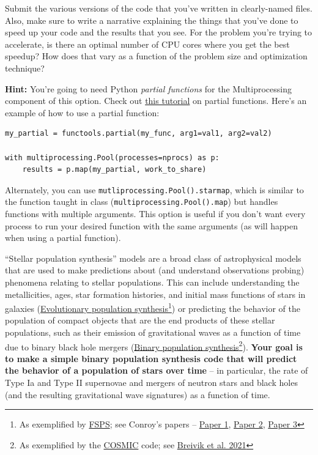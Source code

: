 \documentclass[10pt]{article}
\begin{document}
 Submit the various versions of the code that you've written in
 clearly-named files.  Also, make sure to write a narrative explaining
 the things that you've done to speed up your code and the results
 that you see.  For the problem you're trying to accelerate, is there
 an optimal number of CPU cores where you get the best speedup?  How
 does that vary as a function of the problem size and optimization technique?

\vspace{2mm}
 \noindent
\textbf{Hint:} You're going to need Python \textit{partial functions}
for the Multiprocessing component of this option.  Check out
\href{https://www.pythontutorial.net/python-basics/python-partial-functions/}{this
  tutorial}
on partial functions.  Here's an example of how to use a partial
function:

\begin{verbatim}
my_partial = functools.partial(my_func, arg1=val1, arg2=val2)

with multiprocessing.Pool(processes=nprocs) as p:
    results = p.map(my_partial, work_to_share)
\end{verbatim}

Alternately, you can use \texttt{mutliprocessing.Pool().starmap},
which is similar to the function taught in class
(\texttt{multiprocessing.Pool().map}) but handles functions with
multiple arguments. This option is useful if you don't want every
process to run your desired function with the same arguments (as will
happen when using a partial function). 


 
\newpage
{}  ``Stellar population synthesis''
models are a broad class of astrophysical models that are used to make
predictions about (and understand observations probing) phenomena
relating to stellar populations.  This can include understanding the
metallicities, ages, star formation histories, and initial mass
functions of stars in galaxies
(\href{https://academic.oup.com/mnras/article/362/3/799/976732}{Evolutionary
population synthesis}\footnote{As exemplified by
\href{https://github.com/cconroy20/fsps}{FSPS}; see Conroy's papers --
\href{https://ui.adsabs.harvard.edu/abs/2009ApJ...699..486C/abstract}{Paper 1},
\href{https://ui.adsabs.harvard.edu/abs/2010ApJ...708...58C/abstract}{Paper
  2}, \href{https://ui.adsabs.harvard.edu/abs/2010ApJ...712..833C/abstract}{Paper 3}}) or predicting the behavior of the population of
compact objects that are the end products of these stellar
populations, such as their emission of gravitational waves as a
function of time due to binary black hole mergers
(\href{https://ui.adsabs.harvard.edu/abs/2020ApJ...898...71B/abstract}{Binary
population synthesis}\footnote{As exemplified by the \href{https://cosmic-popsynth.github.io/}{COSMIC} code; see
\href{https://ui.adsabs.harvard.edu/abs/2020ApJ...898...71B/abstract}{Breivik
  et al. 2021}}).
\textbf{Your goal is to make a simple binary population synthesis code
that will predict the behavior of a population of stars over time} -- in
particular, the rate of Type Ia and Type II supernovae and mergers
of neutron stars and black holes (and the resulting gravitational wave
signatures) as a function of time.
\end{document}

